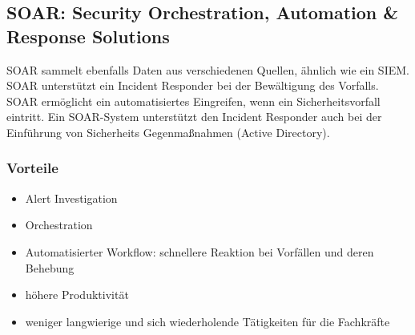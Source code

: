 %
%

\subsection{SOAR: Security Orchestration, Automation \& Response Solutions}\label{subsec:soar}
SOAR sammelt ebenfalls Daten aus verschiedenen Quellen, ähnlich wie ein SIEM.
SOAR unterstützt ein Incident Responder bei der Bewältigung des Vorfalls. SOAR ermöglicht ein automatisiertes Eingreifen, wenn ein Sicherheitsvorfall eintritt. Ein SOAR-System unterstützt den Incident Responder auch bei der Einführung von Sicherheits Gegenmaßnahmen (Active Directory).\\

\subsubsection{Vorteile}
\begin{itemize}
    \item Alert Investigation
    \item Orchestration
    \item Automatisierter Workflow: schnellere Reaktion bei Vorfällen und deren Behebung
    \item höhere Produktivität
    \item weniger langwierige und sich wiederholende Tätigkeiten für die Fachkräfte
\end{itemize}

